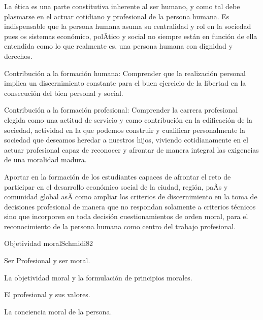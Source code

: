 \begin{syllabus}


\begin{justification}
La ética es una parte constitutiva inherente al ser humano, y  como tal debe plasmarse en el 
actuar cotidiano y profesional de la persona humana. Es indispensable que la persona humana 
asuma su centralidad y rol en la sociedad pues os sistemas económico, polÃ­tico y social no 
siempre están en función de ella entendida como lo que realmente es, una persona humana con 
dignidad y derechos.

Contribución a la formación humana: Comprender que la realización personal implica  un 
discernimiento constante para el buen ejercicio de la libertad en la consecución del bien 
personal y social.

Contribución a la formación profesional: Comprender la carrera profesional elegida como 
una actitud de servicio y como contribución en la edificación de la sociedad, actividad 
en la que podemos construir  y cualificar personalmente la sociedad que deseamos heredar 
a nuestros hijos, viviendo cotidianamente en el actuar profesional capaz de reconocer y 
afrontar de manera integral las exigencias de una moralidad madura.

\end{justification}

\begin{goals}
\item Aportar en la formación de los estudiantes capaces de afrontar el reto de participar 
en el desarrollo económico social de la ciudad, región, paÃ­s y comunidad global asÃ­ 
como ampliar los criterios de discernimiento en la toma de decisiones profesional de 
manera que no respondan solamente a criterios técnicos sino que incorporen en toda 
decisión cuestionamientos de orden moral, para el reconocimiento de la persona 
humana como centro del trabajo profesional.
\end{goals}

\begin{outcomes}
\end{outcomes}

\begin{unit}{Objetividad moral}{Schmidi}{8}{2}
\begin{topics}
      \item Ser Profesional y ser moral.
      \item La objetividad moral y la formulación de principios morales.
      \item El profesional y sus valores.
      \item La conciencia moral de la persona.
\end{topics}


\end{unit}
\end{syllabus}

